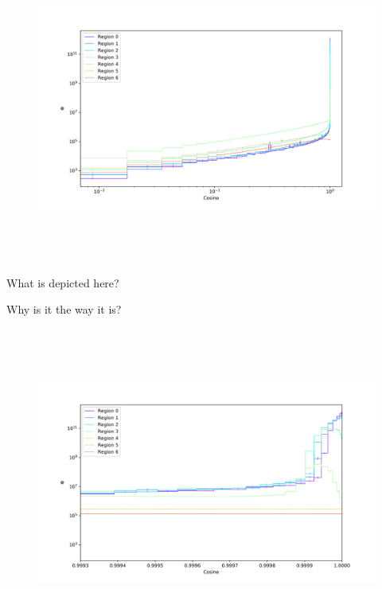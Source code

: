 \clearpage

%
\begin{figure}[htb]
\centering
\includegraphics[height=4in]{tex/figures/flux_rad_cos.png}
\caption[]{}
\label{fig:}
\end{figure}

What is depicted here?

Why is it the way it is?

\clearpage

%
\begin{figure}[htb]
\centering
\includegraphics[height=4in]{tex/figures/flux_rad_cos_detail.png}
\caption[]{}
\label{fig:}
\end{figure}

